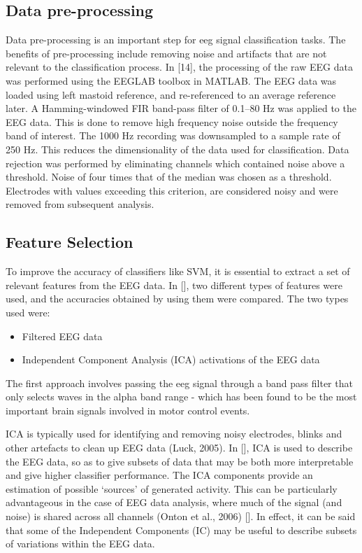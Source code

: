 \documentclass{article} %
\begin{document}
\subsection{Data pre-processing}
Data pre-processing is an important step for eeg signal classification tasks. The benefits of pre-processing include removing noise and artifacts that are not relevant to the classification process. In [14], the processing of the raw EEG data was performed using the EEGLAB toolbox \cite{eeglab} in MATLAB. The EEG data was loaded using left mastoid reference, and re-referenced to an average reference later. A Hamming-windowed FIR band-pass filter of 0.1–80 Hz was applied to the EEG data. This is done to remove high frequency noise outside the frequency band of interest. The 1000 Hz recording was downsampled to a sample rate of 250 Hz. This reduces the dimensionality of the data used for classification.
Data rejection was performed by eliminating channels which contained noise above a threshold. Noise of four times that of the median was chosen as a threshold. Electrodes with values exceeding this criterion, are considered noisy and were removed from subsequent analysis.

\subsection{Feature Selection}
To improve the accuracy of classifiers like SVM, it is essential to extract a set of relevant features from the EEG data. In [], two different types of features were used, and the accuracies obtained by using them were compared. The two types used were:

\begin{itemize}
	\item Filtered EEG data
	\item Independent Component Analysis (ICA) activations of the EEG data
\end{itemize}

The first approach involves passing the eeg signal through a band pass filter that only selects waves in the alpha band range - which has been found to be the most important brain signals involved in motor control events.

ICA is typically used for identifying and removing noisy electrodes, blinks and other artefacts to clean up EEG data (Luck, 2005). In [], ICA is used to describe the EEG data, so as to give subsets of data that may be both more interpretable and give higher classifier performance. The ICA components provide an estimation of possible ‘sources’ of generated activity. This can be particularly advantageous in the case of EEG data analysis, where much of the signal (and noise) is shared across all channels (Onton et al., 2006) []. In effect, it can be said that some of the Independent Components (IC) may be useful to describe subsets of variations within the EEG data. 
\end{document}

